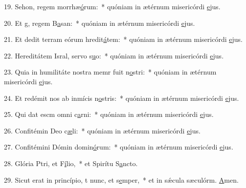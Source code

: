 19. Sehon, regem morrhæ\uline{ó}rum:~* quóniam in ætérnum misericórdi \uline{e}jus.\par 
20. Et g, regem B\uline{a}san:~* quóniam in ætérnum misericórdi \uline{e}jus.\par 
21. Et dedit terram eórum hredit\uline{á}tem:~* quóniam in ætérnum misericórdi \uline{e}jus.\par 
22. Hereditátem Isral, servo s\uline{u}o:~* quóniam in ætérnum misericórdi \uline{e}jus.\par 
23. Quia in humilitáte nostra memr fuit n\uline{o}stri:~* quóniam in ætérnum misericórdi \uline{e}jus.\par 
24. Et redémit nos ab inmícis n\uline{o}stris:~* quóniam in ætérnum misericórdi \uline{e}jus.\par 
25. Qui dat escm omni c\uline{a}rni:~* quóniam in ætérnum misericórdi \uline{e}jus.\par 
26. Confitémin Deo c\uline{æ}li:~* quóniam in ætérnum misericórdi \uline{e}jus.\par 
27. Confitémini Dómin domin\uline{ó}rum:~* quóniam in ætérnum misericórdi \uline{e}jus.\par 
28. Glória Ptri, et F\uline{í}lio,~* et Spirítu S\uline{a}ncto.\par 
29. Sicut erat in princípio, t nunc, et s\uline{e}mper,~* et in sǽcula sæculórm. \uline{A}men.\par 
